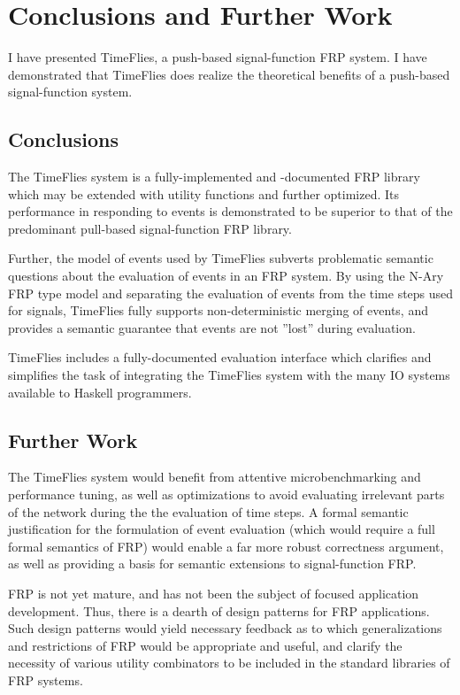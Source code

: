 \chapter{Conclusions and Further Work}
\label{chapter:Conclusions_and_Further_Work}
I have presented TimeFlies, a push-based signal-function FRP system. I have
demonstrated that TimeFlies does realize the theoretical benefits of a
push-based signal-function system.

\section{Conclusions}
\label{section:Conclusions_and_Further_Work-Conclusions}
The TimeFlies system is a fully-implemented and -documented FRP library which
may be extended with utility functions and further optimized. Its performance in
responding to events is demonstrated to be superior to that of the predominant
pull-based signal-function FRP library.

Further, the model of events used by TimeFlies subverts problematic semantic
questions about the evaluation of events in an FRP system. By using the N-Ary
FRP type model and separating the evaluation of events from the time steps used
for signals, TimeFlies fully supports non-deterministic merging of events,
and provides a semantic guarantee that events are not ''lost'' during evaluation.

TimeFlies includes a fully-documented evaluation interface which clarifies and
simplifies the task of integrating the TimeFlies system with the many IO systems
available to Haskell programmers.

\section{Further Work}
\label{section:Conclusions_and_Further_Work-Further_Work}
The TimeFlies system would benefit from attentive microbenchmarking and performance
tuning, as well as optimizations to avoid evaluating irrelevant parts of the network
during the the evaluation of time steps. A formal semantic justification for the
formulation of event evaluation (which would require a full formal semantics of FRP)
would enable a far more robust correctness argument, as well as providing a basis for
semantic extensions to signal-function FRP.

FRP is not yet mature, and has not been the subject of focused application development.
Thus, there is a dearth of design patterns for FRP applications. Such design patterns
would yield necessary feedback as to which generalizations and restrictions of FRP would
be appropriate and useful, and clarify the necessity of various utility combinators to
be included in the standard libraries of FRP systems.


